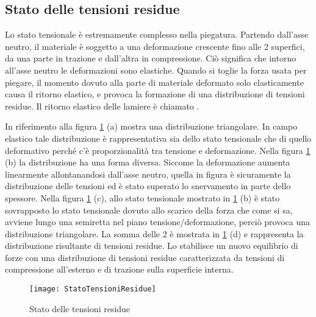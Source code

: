 \subsection{Stato delle tensioni residue}
Lo stato tensionale è estremamente complesso nella piegatura.
Partendo dall'asse neutro, il materiale è soggetto a una deformazione crescente fino alle 2 superfici, da una parte in trazione e dall'altra in compressione. Ciò significa che intorno all'asse neutro le deformazioni sono elastiche.
Quando si toglie la forza usata per piegare, il momento dovuto alla parte di materiale
deformato solo elasticamente causa il ritorno elastico, e provoca la formazione di una
distribuzione di tensioni residue. Il ritorno elastico delle lamiere è chiamato .

In riferimento alla figura \ref{fig:StatoTensioniResidue} (a) mostra una distribuzione triangolare. In campo elastico tale distribuzione è rappresentativa sia dello stato tensionale che di quello deformativo perché c'è proporzionalità tra tensione e deformazione. Nella figura \ref{fig:StatoTensioniResidue} (b) la distribuzione ha una forma diversa. Siccome la deformazione aumenta linearmente allontanandosi dall'asse neutro, quella in figura è sicuramente la distribuzione delle tensioni ed è stato superato lo snervamento in parte dello spessore. Nella figura \ref{fig:StatoTensioniResidue} (c), allo stato tensionale mostrato in \ref{fig:StatoTensioniResidue} (b) è stato sovrapposto lo stato tensionale dovuto allo scarico della forza che come si sa, avviene lungo una semiretta nel piano tensione/deformazione, perciò provoca una distribuzione triangolare. La somma delle 2 è mostrata in \ref{fig:StatoTensioniResidue} (d) e rappresenta la distribuzione risultante di
tensioni residue.
Lo  stabilisce un nuovo equilibrio di forze con una distribuzione di tensioni residue
caratterizzata da tensioni di compressione all'esterno e di trazione sulla superficie interna.

\begin{figure}
\centering
\texttt{[image: StatoTensioniResidue]}
\caption{Stato delle tensioni residue}
\label{fig:StatoTensioniResidue}
\end{figure}

